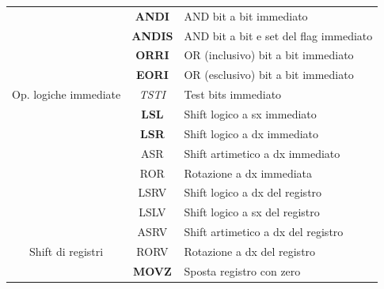 \documentclass[12pt,a4paper]{article}
\begin{document}
\begin{longtable}{|c|c|l|}
                                                           & \textbf{ANDI}         & AND bit a bit immediato                            \\ \cline{2-3} 
                                                           & \textbf{ANDIS}        & AND bit a bit e set del flag immediato             \\ \cline{2-3} 
                                                           & \textbf{ORRI}         & OR (inclusivo) bit a bit immediato                 \\ \cline{2-3} 
                                                           & \textbf{EORI}         & OR (esclusivo) bit a bit immediato                 \\ \cline{2-3} 
\multirow{-5}{*}{Op. logiche immediate}             & \textit{TSTI}         & Test bits immediato                                \\ \hline
                                                           & \textbf{LSL}          & Shift logico a sx immediato                  \\ \cline{2-3} 
                                                           & \textbf{LSR}          & Shift logico a dx immediato                    \\ \cline{2-3} 
                                                           & ASR                   & Shift artimetico a dx immediato                \\ \cline{2-3} 
                                                           & ROR                   & Rotazione a dx immediata                       \\ \cline{2-3} 
                                                           & LSRV                  & Shift logico a dx del registro                 \\ \cline{2-3} 
                                                           & LSLV                  & Shift logico a sx del registro               \\ \cline{2-3} 
                                                           & ASRV                  & Shift artimetico a dx del registro             \\ \cline{2-3} 
\multirow{-8}{*}{Shift di registri}                        & RORV                  & Rotazione a dx del registro                    \\ \hline
                                                           & \textbf{MOVZ}         & Sposta registro con zero                           \\ \cline{2-3} 

\end{longtable}
\end{document}
